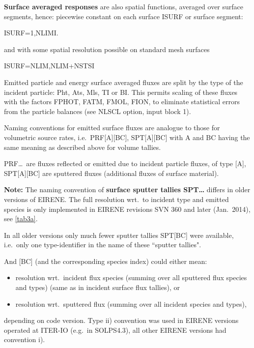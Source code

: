 \textbf{Surface averaged responses} are also spatial functions, averaged over
surface segments, hence:
piecewise constant on each surface ISURF or surface segment:

ISURF=1,NLIMI.

and with some spatial resolution possible on standard mesh surfaces

ISURF=NLIM,NLIM+NSTSI

Emitted particle and energy surface averaged fluxes are split by the type of
the incident particle: \acf{Pht}, \acf{Ats}, \acf{Mls}, \acf{TI} or \ac{BI}.
This permits scaling of these fluxes with the factors FPHOT, FATM, FMOL, FION,
to eliminate statistical errors from the particle balances (see NLSCL option,
input block 1).

\medskip

Naming conventions for emitted surface fluxes are analogue to those for
volumetric source rates, i.e.\ PRF[A][BC],  SPT[A][BC] with A and BC having the
same meaning as described above for volume tallies.

PRF\dots\ are fluxes reflected or emitted due to incident particle fluxes, of
type [A], SPT[A][BC] are sputtered fluxes (additional fluxes of surface
material).

\textbf{Note:} The naming convention of
\textbf{surface sputter tallies SPT\dots} differs in older versions of EIRENE.
The full resolution wrt.\ to incident type and emitted species is only
implemented in EIRENE revisions SVN 360 and later (Jan.\ 2014), see
\cref{tab3a}.

In all older versions only much fewer sputter tallies SPT[BC] were available,
i.e.\ only one type-identifier in the name of these ``sputter tallies".

And [BC] (and the corresponding species index) could either mean:

\begin{itemize}
  \item[i)]  resolution wrt.\ incident flux species (summing over all sputtered
        flux species and types) (same as in incident surface flux tallies), or
  \item[ii)] resolution wrt.\ sputtered flux (summing over all incident species
        and types),
\end{itemize}

depending on code version.
Type ii) convention was used in EIRENE versions operated at ITER-IO (e.g.\ in
SOLPS4.3), all other EIRENE versions had convention i).

